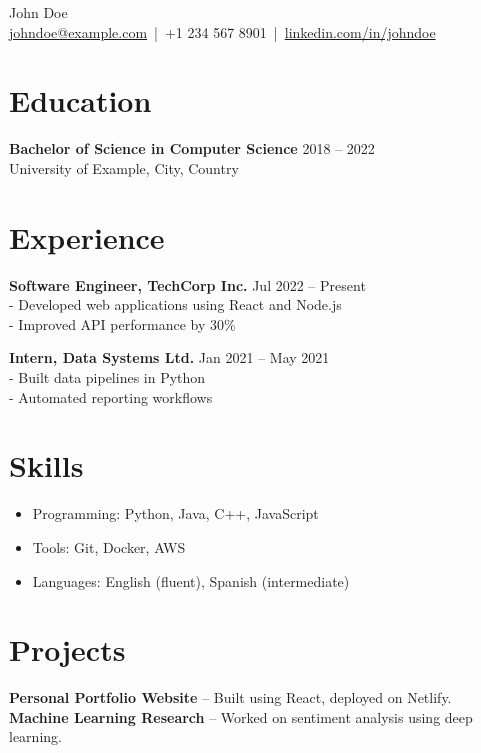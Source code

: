 \documentclass[11pt,a4paper]{article}
\begin{document}
\begin{center}
    {\Huge John Doe} \\
    \vspace{2mm}
    \href{mailto:johndoe@example.com}{johndoe@example.com} \,|\, +1 234 567 8901 \,|\, \href{https://linkedin.com/in/johndoe}{linkedin.com/in/johndoe}
\end{center}

\vspace{6mm}

\section*{Education}
\textbf{Bachelor of Science in Computer Science} \hfill 2018 -- 2022 \\
University of Example, City, Country

\section*{Experience}
\textbf{Software Engineer, TechCorp Inc.} \hfill Jul 2022 -- Present \\
- Developed web applications using React and Node.js \\
- Improved API performance by 30\%

\textbf{Intern, Data Systems Ltd.} \hfill Jan 2021 -- May 2021 \\
- Built data pipelines in Python \\
- Automated reporting workflows

\section*{Skills}
\begin{itemize}[noitemsep,nolistsep]
    \item Programming: Python, Java, C++, JavaScript
    \item Tools: Git, Docker, AWS
    \item Languages: English (fluent), Spanish (intermediate)
\end{itemize}

\section*{Projects}
\textbf{Personal Portfolio Website} -- Built using React, deployed on Netlify. \\
\textbf{Machine Learning Research} -- Worked on sentiment analysis using deep learning.
\end{document}
